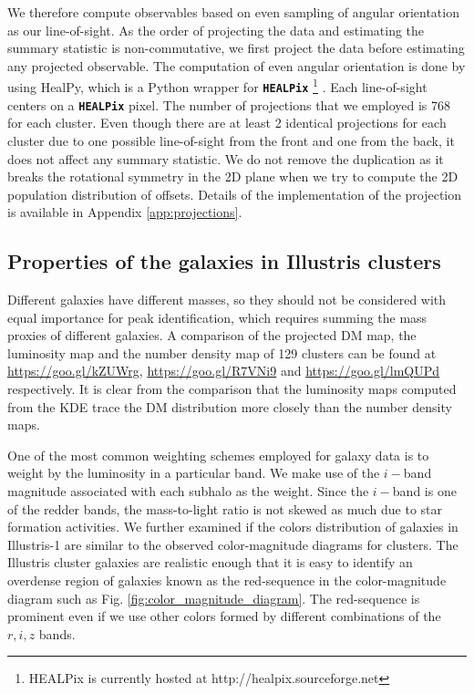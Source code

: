 We therefore compute observables based on even sampling of angular orientation 
as our line-of-sight.
As the order of projecting the data and estimating the summary statistic is
non-commutative, we first project the data before estimating any projected 
observable. 
The computation of even angular orientation 
is done by using HealPy, which is a Python wrapper for
{\bf \texttt{HEALPix}} \footnote{HEALPix is
currently hosted at http://healpix.sourceforge.net}
\citep{Gorski2005}. Each line-of-sight centers on a {\bf \texttt{HEALPix}} 
pixel.
The number of projections that we employed is 768 for each cluster.
Even though there are at least 2 identical projections for each cluster due to
one possible line-of-sight from the front and one from the back, it does not
affect any summary statistic. We do not remove the duplication as it breaks
the rotational symmetry in the 2D plane when we try to compute the 2D population
distribution of offsets.  
Details of the implementation of the projection is available in Appendix
\ref{app:projections}.


\subsection{Properties of the galaxies in Illustris clusters}
\label{subsec:galaxy_properties}

Different galaxies have different masses, so they should not be considered with equal
importance for peak identification, which requires summing
the mass proxies of different galaxies. A comparison of the projected 
DM map, the luminosity map and the number density map of 129 clusters 
can be found at \href{https://goo.gl/kZUWrg}{https://goo.gl/kZUWrg}, 
\href{https://goo.gl/R7VNi9}{https://goo.gl/R7VNi9} and
\href{https://goo.gl/lmQUPd}{https://goo.gl/lmQUPd} respectively.
It is clear from the comparison that the luminosity maps computed from the KDE 
trace the DM distribution more closely than the number density maps. 

One of the most common weighting schemes employed for galaxy data is to weight
by the luminosity in a particular band. We make use of the $i-$band magnitude
associated with each subhalo as the weight. Since the $i-$band is
one of the redder bands, the mass-to-light ratio is not skewed as much due to star
formation activities. 
We further examined if the colors distribution of galaxies in Illustris-1 are
similar to the observed color-magnitude diagrams for clusters.
The Illustris cluster galaxies are realistic enough that it is easy to
identify an overdense region of galaxies known as the red-sequence in the 
color-magnitude diagram such as Fig.
\ref{fig:color_magnitude_diagram}. The red-sequence is prominent even if we
use other colors formed by different combinations of the $r, i, z$ bands.

